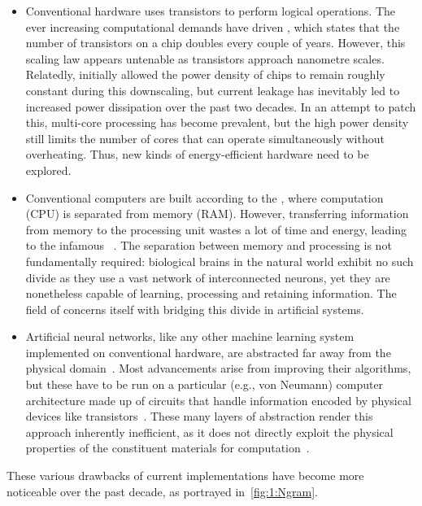 \begin{itemize}
	\item Conventional hardware uses transistors to perform logical operations.
	The ever increasing computational demands have driven , which states that the number of transistors on a chip doubles every couple of years.
	However, this scaling law appears untenable as transistors approach nanometre scales.
	Relatedly,  initially allowed the power density of chips to remain roughly constant during this downscaling, but current leakage has inevitably led to increased power dissipation over the past two decades.
	In an attempt to patch this, multi-core processing has become prevalent, but the high power density still limits the number of cores that can operate simultaneously without overheating. %
	Thus, new kinds of energy-efficient hardware need to be explored.
	\item Conventional computers are built according to the , where computation (CPU) is separated from memory (RAM).
	However, transferring information from memory to the processing unit wastes a lot of time and energy, leading to the infamous ~\cite{TaskAdaptivePRC}.
	The separation between memory and processing is not fundamentally required: biological brains in the natural world exhibit no such divide as they use a vast network of interconnected neurons, yet they are nonetheless capable of learning, processing and retaining information.
	The field of  concerns itself with bridging this divide in artificial systems.
	\item Artificial neural networks, like any other machine learning system implemented on conventional hardware, are abstracted far away from the physical domain~\cite{RC_ASI}.
	Most advancements arise from improving their algorithms, but these have to be run on a particular (e.g., von Neumann) computer architecture made up of circuits that handle information encoded by physical devices like transistors~\cite{RC_SuperconductingElectronics}.
	These many layers of abstraction render this approach inherently inefficient, as it does not directly exploit the physical properties of the constituent materials for computation~\cite{RC_ASI}.
\end{itemize}
These various drawbacks of current implementations have become more noticeable over the past decade, as portrayed in~\cref{fig:1:Ngram}.
